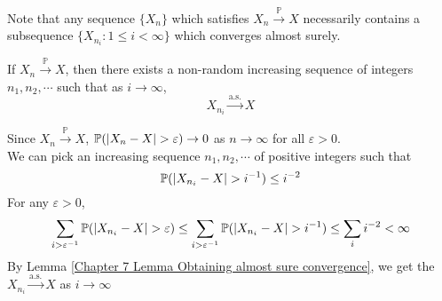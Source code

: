 \documentclass{huhtakm-template-book}
\newcommand{\prob}{\mathbb{P}}
\begin{document}
Note that any sequence $\{X_{n}\}$ which satisfies $X_{n}\xrightarrow{\prob}X$ necessarily contains a subsequence $\{X_{n_{i}}:1\leq i<\infty\}$ which converges almost surely.
\begin{thm}
    If $X_{n}\xrightarrow{\prob}X$, then there exists a non-random increasing sequence of integers $n_{1},n_{2},\cdots$ such that as $i\to\infty$,
    \begin{equation*}
        X_{n_{i}}\xrightarrow{\text{a.s.}}X
    \end{equation*}
\end{thm}
\begin{proofing}
    Since $X_{n}\xrightarrow{\prob}X$, $\prob(\abs{X_{n}-X}>\varepsilon)\to 0$ as $n\to\infty$ for all $\varepsilon>0$.\\
    We can pick an increasing sequence $n_{1},n_{2},\cdots$ of positive integers such that
    \begin{equation*}
        \prob(\abs{X_{n_{i}}-X}>i^{-1})\leq i^{-2}
    \end{equation*}
    For any $\varepsilon>0$,
    \begin{equation*}
        \sum_{i>\varepsilon^{-1}}\prob(\abs{X_{n_{i}}-X}>\varepsilon)\leq\sum_{i>\varepsilon^{-1}}\prob(\abs{X_{n_{i}}-X}>i^{-1})\leq\sum_{i}i^{-2}<\infty
    \end{equation*}
    By Lemma \ref{Chapter 7 Lemma Obtaining almost sure convergence}, we get the $X_{n_{i}}\xrightarrow{\text{a.s.}}X$ as $i\to\infty$
\end{proofing}

\newpage
\end{document}
